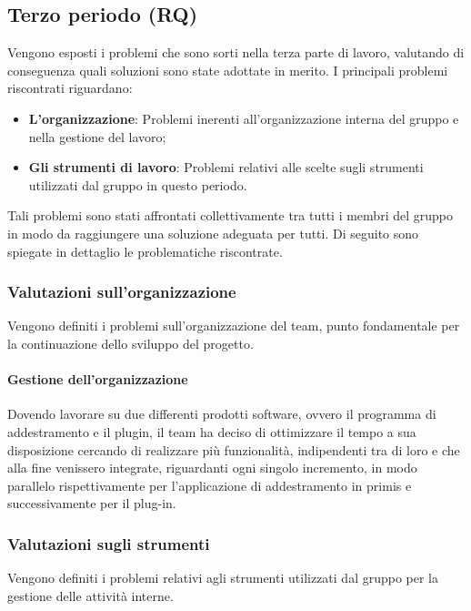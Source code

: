 \documentclass[../piano-di-qualifica.tex]{subfiles}
\begin{document}
\subsection{Terzo periodo (RQ)}
\label{sub:terzo_periodo_rq}
Vengono esposti i problemi che sono sorti nella terza parte di lavoro, valutando di conseguenza quali soluzioni sono state adottate in merito.
I principali problemi riscontrati riguardano:
\begin{itemize}
    \item \textbf{L'organizzazione}: Problemi inerenti all'organizzazione interna del gruppo e nella gestione del lavoro;
    \item \textbf{Gli strumenti di lavoro}: Problemi relativi alle scelte sugli strumenti utilizzati dal gruppo in questo periodo.
\end{itemize}
Tali problemi sono stati affrontati collettivamente tra tutti i membri del gruppo in modo da raggiungere una soluzione adeguata per tutti.
Di seguito sono spiegate in dettaglio le problematiche riscontrate.

\subsubsection{Valutazioni sull’organizzazione}
\label{sssec:valutazioni_organizzazione}
Vengono definiti i problemi sull'organizzazione del team, punto fondamentale per la continuazione dello sviluppo del progetto.

\paragraph{Gestione dell'organizzazione}
\label{sub:gestione_organizzazione}
Dovendo lavorare su due differenti prodotti software, ovvero il programma di addestramento e il plugin, il team ha deciso di ottimizzare il tempo a sua disposizione cercando di realizzare più funzionalità, indipendenti tra di loro e che alla fine venissero integrate, riguardanti ogni singolo incremento, in modo parallelo
rispettivamente per l'applicazione di addestramento in primis e successivamente per il plug-in. 

\subsubsection{Valutazioni sugli strumenti}
\label{sssec:valutazioni_strumenti}
Vengono definiti i problemi relativi agli strumenti utilizzati dal gruppo per la gestione delle attività interne.
\end{document}
